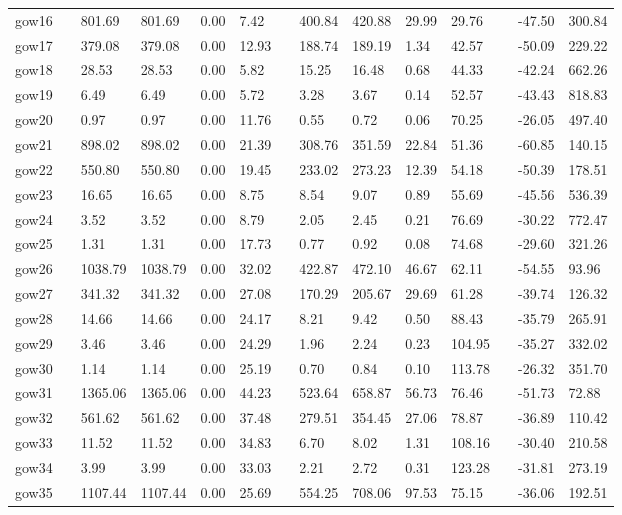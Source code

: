 \begin{table}[H]
\begin{tabularx}{\textwidth}{llXXXXlXXXXlXX}
    gow16 && 801.69 & 801.69 & 0.00 & 7.42 && 400.84 & 420.88 & 29.99 & 29.76 && -47.50 & 300.84\\
    gow17 && 379.08 & 379.08 & 0.00 & 12.93 && 188.74 & 189.19 & 1.34 & 42.57 && -50.09 & 229.22\\
    gow18 && 28.53 & 28.53 & 0.00 & 5.82 && 15.25 & 16.48 & 0.68 & 44.33 && -42.24 & 662.26\\
    gow19 && 6.49 & 6.49 & 0.00 & 5.72 && 3.28 & 3.67 & 0.14 & 52.57 && -43.43 & 818.83\\
    gow20 && 0.97 & 0.97 & 0.00 & 11.76 && 0.55 & 0.72 & 0.06 & 70.25 && -26.05 & 497.40\\
    gow21 && 898.02 & 898.02 & 0.00 & 21.39 && 308.76 & 351.59 & 22.84 & 51.36 && -60.85 & 140.15\\
    gow22 && 550.80 & 550.80 & 0.00 & 19.45 && 233.02 & 273.23 & 12.39 & 54.18 && -50.39 & 178.51\\
    gow23 && 16.65 & 16.65 & 0.00 & 8.75 && 8.54 & 9.07 & 0.89 & 55.69 && -45.56 & 536.39\\
    gow24 && 3.52 & 3.52 & 0.00 & 8.79 && 2.05 & 2.45 & 0.21 & 76.69 && -30.22 & 772.47\\
    gow25 && 1.31 & 1.31 & 0.00 & 17.73 && 0.77 & 0.92 & 0.08 & 74.68 && -29.60 & 321.26\\
    gow26 && 1038.79 & 1038.79 & 0.00 & 32.02 && 422.87 & 472.10 & 46.67 & 62.11 && -54.55 & 93.96\\
    gow27 && 341.32 & 341.32 & 0.00 & 27.08 && 170.29 & 205.67 & 29.69 & 61.28 && -39.74 & 126.32\\
    gow28 && 14.66 & 14.66 & 0.00 & 24.17 && 8.21 & 9.42 & 0.50 & 88.43 && -35.79 & 265.91\\
    gow29 && 3.46 & 3.46 & 0.00 & 24.29 && 1.96 & 2.24 & 0.23 & 104.95 && -35.27 & 332.02\\
    gow30 && 1.14 & 1.14 & 0.00 & 25.19 && 0.70 & 0.84 & 0.10 & 113.78 && -26.32 & 351.70\\
    gow31 && 1365.06 & 1365.06 & 0.00 & 44.23 && 523.64 & 658.87 & 56.73 & 76.46 && -51.73 & 72.88\\
    gow32 && 561.62 & 561.62 & 0.00 & 37.48 && 279.51 & 354.45 & 27.06 & 78.87 && -36.89 & 110.42\\
    gow33 && 11.52 & 11.52 & 0.00 & 34.83 && 6.70 & 8.02 & 1.31 & 108.16 && -30.40 & 210.58\\
    gow34 && 3.99 & 3.99 & 0.00 & 33.03 && 2.21 & 2.72 & 0.31 & 123.28 && -31.81 & 273.19\\
    gow35 && 1107.44 & 1107.44 & 0.00 & 25.69 && 554.25 & 708.06 & 97.53 & 75.15 && -36.06 & 192.51\\

\end{tabularx}
\end{table}
